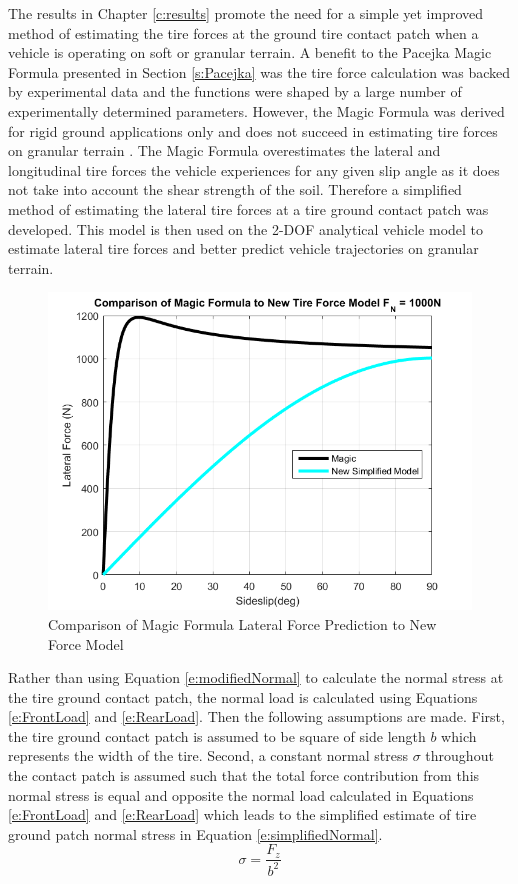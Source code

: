 \documentclass[12pt,onecolumn]{report}
\begin{document}
The results in Chapter \ref{c:results} promote the need for a simple yet improved method of estimating the tire forces at the ground tire contact patch when a vehicle is operating on soft or granular terrain. A benefit to the Pacejka Magic Formula presented in Section \ref{s:Pacejka} was the tire force calculation was backed by experimental data and the functions were shaped by a large number of experimentally determined parameters. However, the Magic Formula was derived for rigid ground applications only and does not succeed in estimating tire forces on granular terrain  \cite{TireSensitivityStudy}. The Magic Formula overestimates the lateral and longitudinal tire forces the vehicle experiences for any given slip angle as it does not take into account the shear strength of the soil. Therefore a simplified method of estimating the lateral tire forces at a tire ground contact patch was developed. This model is then used on the 2-DOF analytical vehicle model to estimate lateral tire forces and better predict vehicle trajectories on granular terrain.

\begin{figure}
	\centering
	\includegraphics[width=0.8\columnwidth]{Figs/MagicvsNew_updatedcolors.png}
	\caption{\small Comparison of Magic Formula Lateral Force Prediction to New Force Model}  
	\label{fig:newForceComparison}
\end{figure}

Rather than using Equation \eqref{e:modifiedNormal} to calculate the normal stress at the tire ground contact patch, the normal load is calculated using Equations \eqref{e:FrontLoad} and \eqref{e:RearLoad}. Then the following assumptions are made. First, the tire ground contact patch is assumed to be square of side length $b$ which represents the width of the tire. Second, a constant normal stress $\sigma$ throughout the contact patch is assumed such that the total force contribution from this normal stress is equal and opposite the normal load calculated in Equations \eqref{e:FrontLoad} and \eqref{e:RearLoad} which leads to the simplified estimate of tire ground patch normal stress in Equation \eqref{e:simplifiedNormal}.
%
\begin{equation}\label{e:simplifiedNormal}
\sigma = \frac{F_z}{b^2}
\end{equation}
\end{document}
